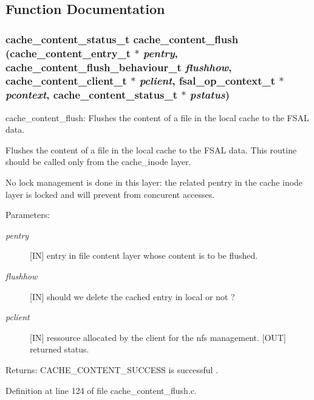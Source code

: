 \subsection{Function Documentation}
\subsubsection{\setlength{\rightskip}{0pt plus 5cm}cache\_\-content\_\-status\_\-t cache\_\-content\_\-flush (cache\_\-content\_\-entry\_\-t $\ast$ {\em pentry}, cache\_\-content\_\-flush\_\-behaviour\_\-t {\em flushhow}, cache\_\-content\_\-client\_\-t $\ast$ {\em pclient}, fsal\_\-op\_\-context\_\-t $\ast$ {\em pcontext}, cache\_\-content\_\-status\_\-t $\ast$ {\em pstatus})}\label{cache__content__flush_8c_a0}


cache\_\-content\_\-flush: Flushes the content of a file in the local cache to the FSAL data.

Flushes the content of a file in the local cache to the FSAL data. This routine should be called only from the cache\_\-inode layer.

No lock management is done in this layer: the related pentry in the cache inode layer is locked and will prevent from concurent accesses.

\begin{Desc}
\item[Parameters:]
\begin{description}
\item[{\em pentry}][IN] entry in file content layer whose content is to be flushed. \item[{\em flushhow}][IN] should we delete the cached entry in local or not ? \item[{\em pclient}][IN] ressource allocated by the client for the nfs management.  [OUT] returned status.\end{description}
\end{Desc}
\begin{Desc}
\item[Returns:]CACHE\_\-CONTENT\_\-SUCCESS is successful . \end{Desc}


Definition at line 124 of file cache\_\-content\_\-flush.c.
